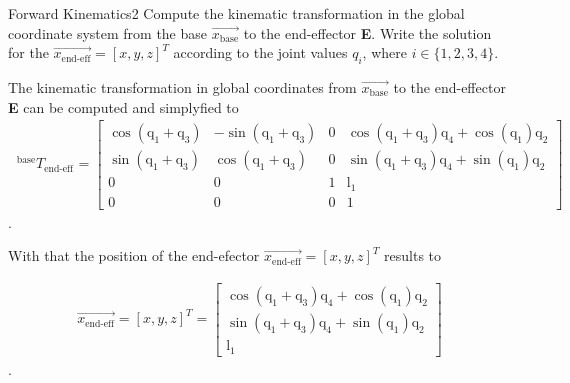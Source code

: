 \begin{questions}


\begin{question}{Forward Kinematics}{2}
Compute the kinematic transformation in the global coordinate system from the base $\vec{x_\textrm{base}}$ to the end-effector \textbf{E}.  
Write the solution for the $\vec{x_\textrm{end-eff}}=[x,y,z]^T$  according to the joint values $q_i$, where $i \in \{1,2,3,4\}$.

\begin{answer}
The kinematic transformation in global coordinates from  $\vec{x_\textrm{base}}$ to the end-effector \textbf{E} can be computed and simplyfied to
\begin{align*}
~^\textrm{base}\!T_{\textrm{end-eff}} &= 
\begin{bmatrix}
\cos(\textrm{q}_{\textrm{1}}+\textrm{q}_{\textrm{3}}) & -\sin(\textrm{q}_{\textrm{1}}+\textrm{q}_{\textrm{3}})& 0 & \cos(\textrm{q}_{\textrm{1}}+\textrm{q}_{\textrm{3}})\textrm{q}_{\textrm{4}} + \cos(\textrm{q}_{\textrm{1}})\textrm{q}_{\textrm{2}} \\
\sin(\textrm{q}_{\textrm{1}}+\textrm{q}_{\textrm{3}}) &\cos(\textrm{q}_{\textrm{1}}+\textrm{q}_{\textrm{3}})  & 0 & \sin(\textrm{q}_{\textrm{1}}+\textrm{q}_{\textrm{3}})\textrm{q}_{\textrm{4}} + \sin(\textrm{q}_{\textrm{1}})\textrm{q}_{\textrm{2}} \\
0 & 0 & 1 & \textrm{l}_{\textrm{1}} \\
0 & 0 & 0 & 1 
\end{bmatrix}
\end{align*}.

With that the position of the end-efector $\vec{x_\textrm{end-eff}}=[x,y,z]^T$ results to

\begin{align*}
\vec{x_\textrm{end-eff}}=[x,y,z]^T = \begin{bmatrix}
\cos(\textrm{q}_{\textrm{1}}+\textrm{q}_{\textrm{3}})\textrm{q}_{\textrm{4}} + \cos(\textrm{q}_{\textrm{1}})\textrm{q}_{\textrm{2}} \\
\sin(\textrm{q}_{\textrm{1}}+\textrm{q}_{\textrm{3}})\textrm{q}_{\textrm{4}} + \sin(\textrm{q}_{\textrm{1}})\textrm{q}_{\textrm{2}} \\
\textrm{l}_{\textrm{1}} 
\end{bmatrix}
\end{align*}.


\end{answer}
\end{question}
\end{questions}
